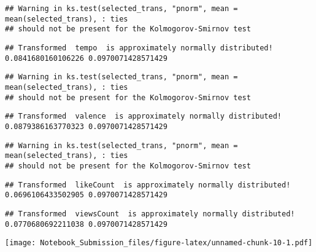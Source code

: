 \documentclass[
]{article}
\begin{document}
\begin{verbatim}
## Warning in ks.test(selected_trans, "pnorm", mean = mean(selected_trans), : ties
## should not be present for the Kolmogorov-Smirnov test
\end{verbatim}

\begin{verbatim}
## Transformed  tempo  is approximately normally distributed! 0.0841680160106226 0.0970071428571429
\end{verbatim}

\begin{verbatim}
## Warning in ks.test(selected_trans, "pnorm", mean = mean(selected_trans), : ties
## should not be present for the Kolmogorov-Smirnov test
\end{verbatim}

\begin{verbatim}
## Transformed  valence  is approximately normally distributed! 0.0879386163770323 0.0970071428571429
\end{verbatim}

\begin{verbatim}
## Warning in ks.test(selected_trans, "pnorm", mean = mean(selected_trans), : ties
## should not be present for the Kolmogorov-Smirnov test
\end{verbatim}

\begin{verbatim}
## Transformed  likeCount  is approximately normally distributed! 0.0696106433502905 0.0970071428571429
\end{verbatim}

\begin{verbatim}
## Transformed  viewsCount  is approximately normally distributed! 0.0770680692211038 0.0970071428571429
\end{verbatim}

\texttt{[image: Notebook\_Submission\_files/figure-latex/unnamed-chunk-10-1.pdf]}
\end{document}

